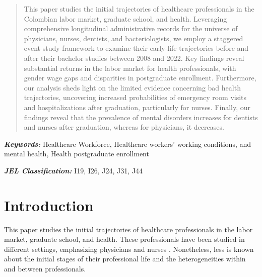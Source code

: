 \documentclass[12pt, a4paper]{article}
\begin{document}
\begin{abstract}
    
This paper studies the initial trajectories of healthcare professionals in the Colombian labor market, graduate school, and health. Leveraging comprehensive longitudinal administrative records for the universe of physicians, nurses, dentists, and bacteriologists, we employ a staggered event study framework to examine their early-life trajectories before and after their bachelor studies between 2008 and 2022. Key findings reveal substantial returns in the labor market for health professionals, with gender wage gaps and disparities in postgraduate enrollment. Furthermore, our analysis sheds light on the limited evidence concerning bad health trajectories, uncovering increased probabilities of emergency room visits and hospitalizations after graduation, particularly for nurses. Finally, our findings reveal that the prevalence of mental disorders increases for dentists and nurses after graduation, whereas for physicians, it decreases.

\end{abstract}


\textit{\textbf{Keywords:}} Healthcare Workforce, Healthcare workers’ working conditions, and mental health, Health postgraduate enrollment


\textit{\textbf{JEL Classification:}} I19, I26, J24, J31, J44

\vspace{.5cm}

\newpage
\section{Introduction}

This paper studies the initial trajectories of healthcare professionals in the labor market, graduate school, and health. These professionals have been studied in different settings, emphasizing physicians and nurses \citep{okeke2023doctor,Posso2024births,chen2021team,doyle2010returns,antonazzo2003labour,Finkelstein2023,andreassen2017nurses,dunn2014physicians}. Nonetheless, less is known about the initial stages of their professional life and the heterogeneities within and between professionals. 
\end{document}

